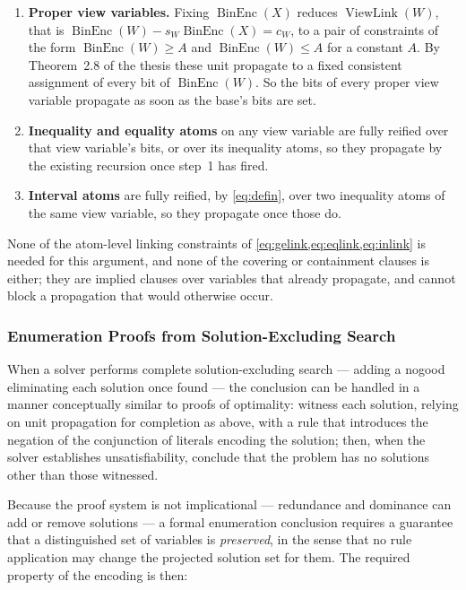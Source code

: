 \documentclass[11pt,a4paper]{article}
\theoremstyle{plain}
\theoremstyle{definition}
\theoremstyle{remark}
\newcommand{\fname}[1]{\ensuremath{\operatorname{#1}}}
\newcommand{\BinEnc}{\fname{BinEnc}}
\newcommand{\ViewLink}{\fname{ViewLink}}
\begin{document}
\begin{enumerate}[itemsep=1pt]
  \item \textbf{Proper view variables.}  Fixing $\BinEnc(X)$ reduces
    $\ViewLink(W)$, that is $\BinEnc(W) - s_W\BinEnc(X) = c_W$, to a pair of
    constraints of the form $\BinEnc(W)\geq A$ and $\BinEnc(W)\leq A$ for a
    constant $A$.  By Theorem~2.8 of the thesis these unit propagate to a fixed
    consistent assignment of every bit of $\BinEnc(W)$.  So the bits of every
    proper view variable propagate as soon as the base's bits are set.
  \item \textbf{Inequality and equality atoms} on any view variable are fully
    reified over that view variable's bits, or over its inequality atoms, so
    they propagate by the existing recursion once step~1 has fired.
  \item \textbf{Interval atoms} are fully reified, by \cref{eq:defin}, over two
    inequality atoms of the same view variable, so they propagate once those
    do.
\end{enumerate}

None of the atom-level linking constraints of
\cref{eq:gelink,eq:eqlink,eq:inlink} is needed
for this argument, and none of the covering or containment clauses is either;
they are implied clauses over variables that already propagate, and cannot
block a propagation that would otherwise occur.

\subsubsection{Enumeration Proofs from Solution-Excluding Search}
\label{sec:enumeration}

When a solver performs complete solution-excluding search --- adding a nogood
eliminating each solution once found --- the conclusion can be handled in a
manner conceptually similar to proofs of optimality: witness each solution,
relying on unit propagation for completion as above, with a rule that introduces
the negation of the conjunction of literals encoding the solution; then, when
the solver establishes unsatisfiability, conclude that the problem has no
solutions other than those witnessed.

Because the proof system is not implicational --- redundance and dominance can
add or remove solutions --- a formal enumeration conclusion requires a
guarantee that a distinguished set of variables is \emph{preserved}, in the
sense that no rule application may change the projected solution set for them.
The required property of the encoding is then:
\end{document}
